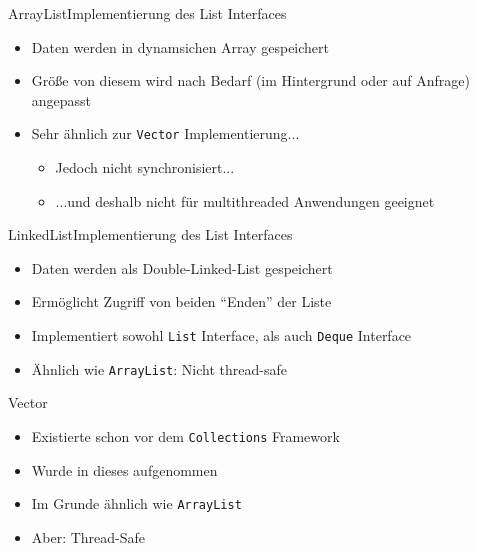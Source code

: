 \begin{frame}{ArrayList}{Implementierung des List Interfaces}
    \begin{itemize}[<+->]
        \item Daten werden in dynamsichen Array gespeichert
        \item Größe von diesem wird nach Bedarf (im Hintergrund oder auf Anfrage) angepasst
        \item Sehr ähnlich zur \texttt{Vector} Implementierung...
        \begin{itemize}
            \item Jedoch nicht synchronisiert...
            \item ...und deshalb nicht für multithreaded Anwendungen geeignet
        \end{itemize}
    \end{itemize}
\end{frame}

\begin{frame}{LinkedList}{Implementierung des List Interfaces}
    \begin{itemize}[<+->]
        \item Daten werden als Double-Linked-List gespeichert
        \item Ermöglicht Zugriff von beiden "`Enden"' der Liste
        \item Implementiert sowohl \texttt{List} Interface, als auch \texttt{Deque} Interface
        \item Ähnlich wie \texttt{ArrayList}: Nicht thread-safe
    \end{itemize}
\end{frame}

\begin{frame}{Vector}{}
    \begin{itemize}[<+->]
        \item Existierte schon vor dem \texttt{Collections} Framework
        \item Wurde in dieses aufgenommen
        \item Im Grunde ähnlich wie \texttt{ArrayList}
        \item Aber: Thread-Safe
    \end{itemize}
\end{frame}


